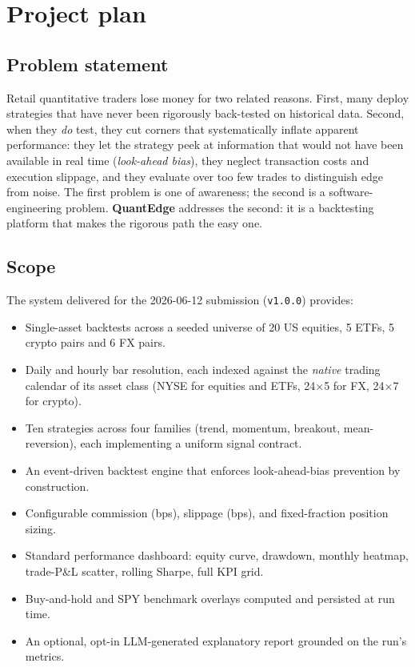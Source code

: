 \section{Project plan}
\label{sec:plan}

\subsection{Problem statement}

Retail quantitative traders lose money for two related reasons. First, many deploy
strategies that have never been rigorously back-tested on historical data. Second,
when they \emph{do} test, they cut corners that systematically inflate apparent
performance: they let the strategy peek at information that would not have been
available in real time (\emph{look-ahead bias}), they neglect transaction costs and
execution slippage, and they evaluate over too few trades to distinguish edge from
noise. The first problem is one of awareness; the second is a software-engineering
problem. \textbf{QuantEdge} addresses the second: it is a backtesting platform
that makes the rigorous path the easy one.

\subsection{Scope}

The system delivered for the 2026-06-12 submission (\texttt{v1.0.0})
provides:

\begin{itemize}
  \item Single-asset backtests across a seeded universe of 20 US equities, 5 ETFs,
        5 crypto pairs and 6 FX pairs.
  \item Daily and hourly bar resolution, each indexed against the \emph{native}
        trading calendar of its asset class (NYSE for equities and ETFs, 24$\times$5
        for FX, 24$\times$7 for crypto).
  \item Ten strategies across four families (trend, momentum, breakout,
        mean-reversion), each implementing a uniform signal contract.
  \item An event-driven backtest engine that enforces look-ahead-bias prevention by
        construction.
  \item Configurable commission (bps), slippage (bps), and fixed-fraction
        position sizing.
  \item Standard performance dashboard: equity curve, drawdown, monthly heatmap,
        trade-P\&L scatter, rolling Sharpe, full KPI grid.
  \item Buy-and-hold and SPY benchmark overlays computed and persisted at run time.
  \item An optional, opt-in LLM-generated explanatory report grounded on the run's
        metrics.
\end{itemize}

